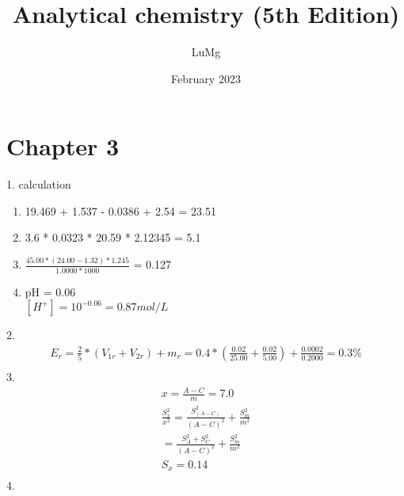 \documentclass{article}
\title{Analytical chemistry (5th Edition)}
\author{LuMg}
\date{February 2023}
\begin{document}
\maketitle

\section{Chapter 3}
1. calculation
\begin{enumerate}
  \item 19.469 + 1.537 - 0.0386 + 2.54 = 23.51
  \item 3.6 * 0.0323 * 20.59 * 2.12345 = 5.1
  \item \(\frac{45.00*(24.00-1.32)*1.245}{1.0000*1000}\) = 0.127
  \item pH = 0.06\\
  $[{H}^{+}] = {10}^{-0.06} = 0.87 mol/L$
\end{enumerate}
2.\begin{equation}
    \begin{multlined}
        E_{r} = \frac{2}{5}*\left(V_{1r}+V_{2r}\right)+m_{r} = 0.4*\left(\frac{0.02}{25.00}+\frac{0.02}{5.00}\right)+\frac{0.0002}{0.2000} = 0.3\%\\
    \end{multlined}
\end{equation}
3.\begin{equation}
    \begin{multlined}
        x = \frac{A-C}{m} = 7.0\\
        \frac{S_x^2}{x^2} = \frac{S_\left(A-C\right)^2}{\left(A-C\right)^2} + \frac{S_m^2}{m^2}\\
        =\frac{S_A^2+S_C^2}{\left(A-C\right)^2} + \frac{S_m^2}{m^2}\\
        S_x = 0.14\\
    \end{multlined}
\end{equation}
4. 
\end{document}
